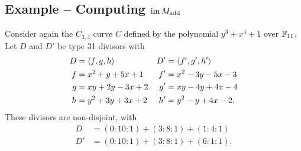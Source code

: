 \begin{comment}
Now we have $L$ and $G$ of degrees 5 and 1, respectively, such that $D + D' = L + G$.
To finish, we must compute the reduction $\bar{\bar L}$ of $L$ and compute $D + D' = \bar{\bar L} + G$.
The reduction $\bar{\bar L}$ will be of type 31, thus the problem of adding $D$ and $D'$
is reduced to adding a degree 3 divisor $\bar{\bar L}$ with a degree 1 divisor $G$.
\end{comment}



\subsection{Example -- Computing $\operatorname{im} M_{\text{add}}$}

Consider again the $C_{3,4}$ curve $C$ defined by the polynomial $y^3 + x^4 + 1$ over $\mathbb{F}_{11}$.
Let $D$ and $D'$ be type 31 divisors with
\begin{align*}
  D  &= \left\langle f, g, h \right\rangle      & D' &= \left\langle f', g', h' \right\rangle  \\
  f  &= x^2 +  y + 5x + 1  & f' &= x^2 - 3y - 5x - 3 \\
  g  &=  xy + 2y - 3x + 2  & g' &=  xy - 4y + 4x - 4 \\
  h  &= y^2 + 3y + 3x + 2  & h' &= y^2 -  y + 4x - 2.
\end{align*}
These divisors are non-disjoint, with
\begin{align*}
  D  &= (0 : 10 : 1) + (3 : 8 : 1) + (1 : 4 : 1) \\
  D' &= (0 : 10 : 1) + (3 : 8 : 1) + (6 : 1 : 1).
\end{align*}

